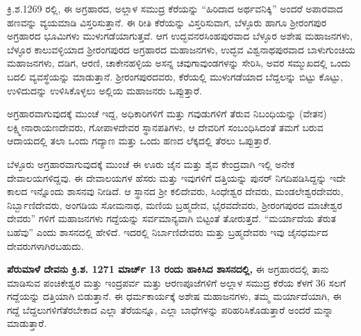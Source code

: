 ಕ್ರಿ.ಶ.1269 ರಲ್ಲಿ, ಈ ಅಗ್ರಹಾರದ, ಅಲ್ಲಾಳ ಸಮುದ್ರ ಕೆರೆಯನ್ನು “ಹಿರಿದಾದ ಅರ್ಥವನಿಕ್ಕಿ” ಅಂದರೆ ಅಪಾರವಾದ ಹಣವನ್ನು ವ್ಯಯಮಾಡಿ ವಿಸ್ತರಿಸುತ್ತಾನೆ. ಈ ರೀತಿ ಕೆರೆಯನ್ನು ವಿಸ್ತರಿಸುವಾಗ, ಬೆಳ್ಳೂರು ಹಾಗೂ ಶ‍್ರೀರಂಗಪುರ ಅಗ್ರಹಾರದ ಭೂಮಿಗಳು ಮುಳುಗಡೆಯಾಗುತ್ತವೆ. ಆಗ ಉದ್ಭವನರಸಿಂಹಪುರವಾದ ಬೆಳ್ಳೂರ ಅಶೇಷ ಮಹಾಜನಗಳು, ಬೆಳ್ಳೂರ ಕಾಲುವಳ್ಳಿಯಾದ ಶ‍್ರೀರಂಗಪುರದ ಅಗ್ರಹಾರದ ಮಹಾಜನಗಳು, ಉದ್ಭವ ವಿಶ್ವನಾಥಪುರವಾದ ಬಾಳುಗುಂಚಿಯ ಮಹಾಜನಗಳು, ದಡಿಗ, ಆರಣಿ, ಚಾಕೇನಹಳ್ಳಿಯ ಅಸನ್ನ ಚವುಗಾವುಂಡಗಳನ್ನು ಸೇರಿಸಿ, ಅವರ ಸಮ್ಮುಖದಲ್ಲಿ ಒಂದು ಬದಲಿ ವ್ಯವಸ್ಥೆಯನ್ನು ಮಾಡುತ್ತಾನೆ. ಶ‍್ರೀರಂಗಪುರದವರು, ಕೆರೆಯಲ್ಲಿ ಮುಳುಗಡೆಯಾದ ಬೆದ್ದಲನ್ನು ಬಿಟ್ಟು ಕೊಟ್ಟು, ಉಳಿದುದನ್ನು ಉಳಿಸಿಕೊಳ್ಳಲು ಅಲ್ಲಿಯ ಮಹಾಜನರು ಒಪ್ಪುತ್ತಾರೆ.

ಅಗ್ರಹಾರವಾಗುವುದಕ್ಕೆ ಮುಂಚೆ ಇದ್ದ, ಅಧಿಕಾರಿಗಳಿಗೆ ಮತ್ತು ಗವುಡುಗಳಿಗೆ ತೆರುವ ನಿಬಂಧಿಯನ್ನು (ವೇತನ) ಲಕ್ಷ್ಮೀನಾರಾಯಣದೇವರು, ಗೋಪಾಳದೇವರ ಸ್ಥಾನಪತಿಗಳು, ಆ ದೇವರಿಗೆ ಸಂಬಂಧಿಸಿದಂತೆ ತಮಗೆ ಬರುವ ಆದಾಯದಲ್ಲಿ ತಲಾ ಒಂದು ಗದ್ಯಾಣ ಮತ್ತು ಒಂದು ಹಣದ ಲೆಕ್ಕದಲ್ಲಿ ತೆರಲು ಒಪ್ಪುತ್ತಾರೆ.

ಬೆಳ್ಳೂರು ಅಗ್ರಹಾರವಾಗುವುದಕ್ಕೆ ಮುಂಚೆ ಈ ಊರು ಜೈನ ಮತ್ತು ಶೈವ ಕೇಂದ್ರವಾಗಿ ಇಲ್ಲಿ ಅನೇಕ ದೇವಾಲಯ\-ಗಳಿದ್ದವು. ಈ ದೇವಾಲಯಗಳ ಹೆಸರು ಮತ್ತು ಇವುಗಳಿಗೆ ದತ್ತಿಯನ್ನು ಪುನರ್​ ನಿಗದಿಪಡಿಸಿದ್ದನ್ನು ಇದೇ ಕಾಲದ ಇನ್ನೊಂದು ಶಾಸನವು ನೀಡಿದೆ. ಆ ಸ್ಥಾನದ ಶ‍್ರೀ ಕಲಿದೇವರು, ಸಿಂಧೇಶ್ವರ ದೇವರು, ಮಂಡಲೇಶ್ವರದೇವರು, ನಿರ್ಬ್ಬಾಣಿದೇವರು, ಅಂಗಡಿಯ ಸೋಮನಾಥ, ಮಣಿಯ ಬ್ರಹ್ಮದೇವ, ಭೈರವದೇವರು, ಶ‍್ರೀರಂಗಪುರದ ಮಾಚೇಶ್ವರ ದೇವರು” ಗಳಿಗೆ ಮಹಾಜನಗಳು ಗದ್ದೆಯನ್ನು ಸರ್ವಮಾನ್ಯವಾಗಿ ಬಿಟ್ಟಂತೆ ತೋರುತ್ತದೆ. “ಮರ್ಯಾದೆಯ ತೆರುತ ಬಹೆವು” ಎಂದು ಶಾಸನದಲ್ಲಿ ಹೇಳಿದೆ. ಇದರಲ್ಲಿ ನಿರ್ಬಾಣಿದೇವರು ಮತ್ತು ಬ್ರಹ್ಮದೇವರು ಇವು ಜೈನಧರ್ಮದ ದೇವರುಗಳಾಗಿರಬಹುದು.

\textbf{ಪೆರುಮಾಳೆ ದೇವನು ಕ್ರಿ.ಶ. 1271 ಮಾರ್ಚ್ 13 ರಂದು ಹಾಕಿಸಿದ ಶಾಸನದಲ್ಲಿ,} ಈ ಅಗ್ರಹಾರದಲ್ಲಿ ತಾನು ಮಾಡಿಸುವ ಪಂಚಿಕೇಶ್ವರ ಮತ್ತು ಇಂದ್ರಪರ್ವ ಮತ್ತು ಆರಣಪೂಜೆಗಳಿಗೆ ಅಲ್ಲಾಳ ಸಮುದ್ರ ಕೆರೆಯ ಕೆಳಗೆ 36 ಸಲಗೆ ಗದ್ದೆಯನ್ನು ದತ್ತಿಯಾಗಿ ಬಿಡುತ್ತಾನೆ. ಈ ಧರ್ಮಕಾರ್ಯಕ್ಕೆ ಅಶೇಷ ಮಹಾಜನಗಳು, ತಮ್ಮ ಮರ್ಯಾದೆಯಾಗಿ, ಈ ಗದ್ದೆ ಬೆದ್ದಲುಗಳಿಗೆ\break ತೆರಬೇಕಾದ ಎಲ್ಲಾ ತೆರೆಯನ್ನೂ, ಎಲ್ಲಾ ಬಾಧೆಗಳನ್ನು ಪರಿಹರಿಸಿಕೊಡುತ್ತಾರೆ ಅಂದರೆ ಮನ್ನಾ ಮಾಡುತ್ತಾರೆ.

